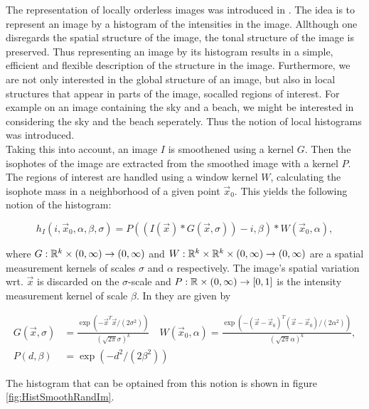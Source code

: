 The representation of locally orderless images was introduced in \cite{koe.99}. The idea is to represent an image by a histogram of the intensities in the image. Allthough one disregards the spatial structure of the image, the tonal structure of the image is preserved. Thus representing an image by its histogram results in a simple, efficient and flexible description of the structure in the image. Furthermore, we are not only interested in the global structure of an image, but also in local structures that appear in parts of the image, socalled regions of interest. For example on an image containing the sky and a beach, we might be interested in considering the sky and the beach seperately. Thus the notion of local histograms was introduced.\\

Taking this into account, an image $I$ is smoothened using a kernel $G$. Then the isophotes of the image are extracted from the smoothed image with a kernel $P$.\\
The regions of interest are handled using a window kernel $W$, calculating the isophote mass in a neighborhood of a given point $\vec{x}_0$. This yields the following notion of the histogram:

\begin{equation}
  h_I(i,\vec{x}_0,\alpha,\beta,\sigma) = P((I(\vec{x})*G(\vec{x},\sigma))-i,\beta)*W(\vec{x}_0,\alpha),
\end{equation}

where $G:\mathbb R^k\times (0,\infty)\to (0,\infty)$ and $W:\mathbb R^k\times \mathbb R^k\times (0,\infty)\to (0,\infty)$ are a spatial measurement kernels of scales $\sigma$ and $\alpha$ respectively. The image's spatial variation wrt. $\vec{x}$ is discarded on the $\sigma$-scale and $P:\mathbb R\times(0,\infty)\to [0,1]$ is the intensity measurement kernel of scale $\beta$. In \cite{koe.99} they are given by

\begin{equation}
  \begin{split}
    G(\vec{x},\sigma) &= \frac{\exp(-\vec{x}^T\vec{x}/(2\sigma^2))}{(\sqrt{2\pi}\sigma)^{k}}\quad W(\vec{x}_0,\alpha) = \frac{\exp(-(\vec{x}-\vec{x}_0)^T(\vec{x}-\vec{x}_0)/(2\alpha^2))}{(\sqrt{2\pi}\alpha)^{k}},\\
    P(d,\beta) &= \exp(-d^2/(2\beta^2))
  \end{split}\label{loikernel}
\end{equation}

The histogram that can be optained from this notion is shown in figure \ref{fig:HistSmoothRandIm}.

